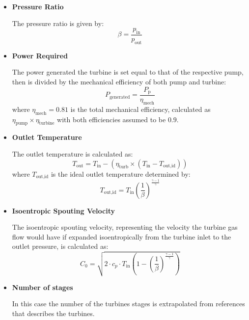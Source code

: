 \begin{itemize}
    \item \textbf{Pressure Ratio}
    
    The pressure ratio is given by:
    \begin{equation}
    \beta = \frac{p_{\text{in}}}{p_{\text{out}}}
    \end{equation}

    \item \textbf{Power Required}
    
    The power generated the turbine is set equal to that of the respective pump, then is divided by the mechanical efficiency of both pump and turbine:
    \begin{equation}
    P_{\text{generated}} = \frac{P_{\text{p}}}{\eta_{\text{mech}}}
    \end{equation}
    where \( \eta_{\text{mech}} = 0.81 \) is the total mechanical efficiency, calculated as \( \eta_{\text{pump}} \times \eta_{\text{turbine}} \) with both efficiencies assumed to be \(0.9\).

    \item \textbf{Outlet Temperature} 
    
    The outlet temperature is calculated as:
    \begin{equation}
    T_{\text{out}} = T_{\text{in}} - \left(\eta_{\text{turb}} \times \left(T_{\text{in}} - T_{\text{out,id}}\right)\right)
    \end{equation}
    where \(T_{\text{out,id}}\) is the ideal outlet temperature determined by:
    \begin{equation}
    T_{\text{out,id}} = T_{\text{in}} \left(\frac{1}{\beta}\right)^{\frac{\gamma - 1}{\gamma}}
    \end{equation}
    \item \textbf{Isoentropic Spouting Velocity} 
    
    The isoentropic spouting velocity, representing the velocity the turbine gas flow would have if expanded isoentropically from the turbine inlet to the outlet pressure, is calculated as:
    \begin{equation}
    C_0 = \sqrt{2 \cdot c_p \cdot T_{\text{in}} \left(1 - \left(\frac{1}{\beta}\right)^{\frac{\gamma - 1}{\gamma}}\right)}
    \end{equation}

\item\textbf{Number of stages}

In this case the number of the turbines stages is extrapolated from references \cite{sutton01} \cite{presentation} that describes the turbines.
\end{itemize}

